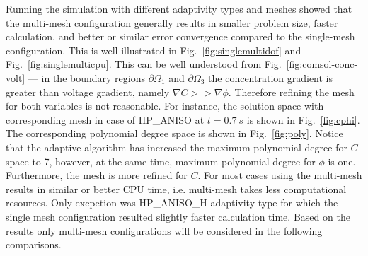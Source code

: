 Running the simulation with different adaptivity
types and meshes showed that the multi-mesh configuration generally results in
smaller problem size, faster calculation, and better or similar error convergence
compared to the single-mesh configuration.
This is well illustrated in Fig.~\ref{fig:singlemultidof} 
and Fig.~\ref{fig:singlemulticpu}.
This can be well understood from Fig.~\ref{fig:comsol-conc-volt} --- in the boundary
regions $\partial \Omega_1$ and $\partial\Omega_3$ the concentration gradient
is greater than voltage gradient, namely $\nabla C >> \nabla \phi$. Therefore
refining the mesh for both variables is not reasonable. For instance,
the solution space with corresponding mesh in case of
HP\_ANISO at $t=0.7\ s$ is shown in Fig.~\ref{fig:cphi}. The corresponding polynomial
degree space is shown in Fig.~\ref{fig:poly}. Notice that the adaptive algorithm
has increased the maximum polynomial degree for $C$ space to 7, however,
at the same time, maximum polynomial degree for $\phi$ is one. Furthermore,
the mesh is more refined for $C$.
For most cases using the multi-mesh results in similar or better CPU time, i.e.
multi-mesh takes less computational resources. Only excpetion was HP\_ANISO\_H 
adaptivity type for which the single mesh configuration resulted slightly faster
calculation time. 
Based on the results only multi-mesh configurations will be considered
in the following comparisons.

